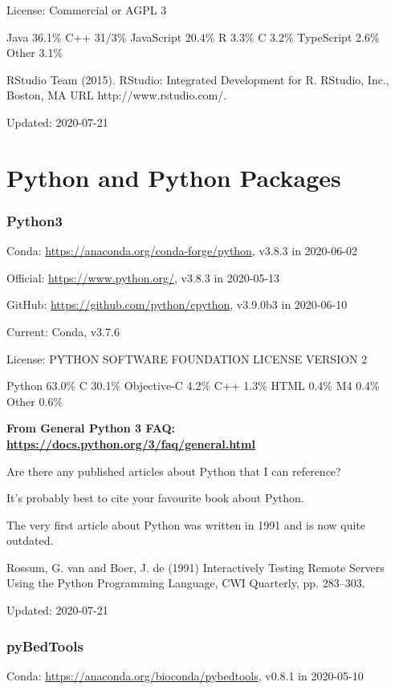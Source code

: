 \documentclass[]{article}
\begin{document}
License: Commercial or AGPL 3

Java 36.1\% C++ 31/3\% JavaScript 20.4\% R 3.3\% C 3.2\% TypeScript 2.6\% Other 3.1\% 

RStudio Team (2015). RStudio: Integrated Development for R. RStudio, Inc., Boston, MA URL http://www.rstudio.com/.

Updated: 2020-07-21





\part{Python and Python Packages}

\section{Python3}

Conda: \url{https://anaconda.org/conda-forge/python}, v3.8.3 in 2020-06-02

Official: \url{https://www.python.org/}, v3.8.3 in 2020-05-13

GitHub: \url{https://github.com/python/cpython}, v3.9.0b3 in 2020-06-10

Current: Conda, v3.7.6

License: PYTHON SOFTWARE FOUNDATION LICENSE VERSION 2

Python 63.0\% C 30.1\% Objective-C 4.2\% C++ 1.3\% HTML 0.4\% M4 0.4\% Other 0.6\% 

\textbf{From General Python 3 FAQ: \url{https://docs.python.org/3/faq/general.html}}

Are there any published articles about Python that I can reference?

It's probably best to cite your favourite book about Python.

The very first article about Python was written in 1991 and is now quite outdated.

Rossum, G. van and Boer, J. de (1991) Interactively Testing Remote Servers Using the Python Programming Language, CWI Quarterly, pp. 283–303.

Updated: 2020-07-21

\section{pyBedTools}

Conda: \url{https://anaconda.org/bioconda/pybedtools}, v0.8.1 in 2020-05-10
\end{document}
